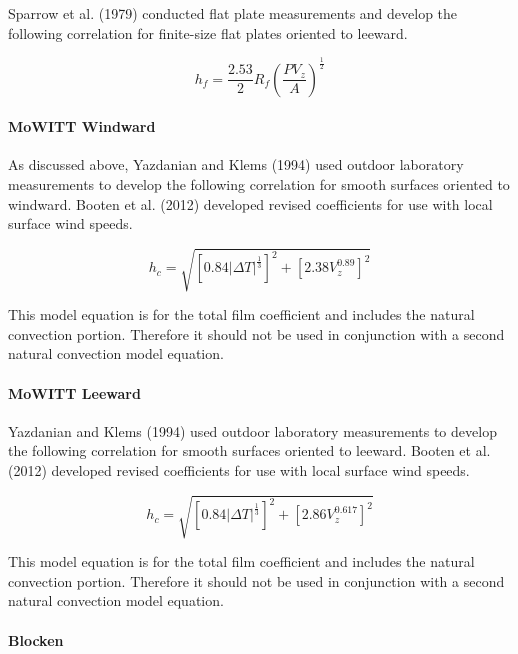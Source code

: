 Sparrow et al. (1979) conducted flat plate measurements and develop the following correlation for finite-size flat plates oriented to leeward.

\begin{equation}
{h_f} = \frac{{2.53}}{2}{R_f}{\left( {\frac{{P{V_z}}}{A}} \right)^{{\frac{1}{2}}}}
\end{equation}

\paragraph{MoWITT Windward}\label{mowitt-windward}

As discussed above, Yazdanian and Klems (1994) used outdoor laboratory measurements to develop the following correlation for smooth surfaces oriented to windward. Booten et al. (2012) developed revised coefficients for use with local surface wind speeds.

\begin{equation}
{h_c} = \sqrt {{{\left[ {0.84{{\left| {\Delta T} \right|}^{{\frac{1}{3}}}}} \right]}^2} + {{\left[ {2.38  V_z^{0.89}} \right]}^2}}
\end{equation}

This model equation is for the total film coefficient and includes the natural convection portion. Therefore it should not be used in conjunction with a second natural convection model equation.

\paragraph{MoWITT Leeward}\label{mowitt-leeward}

Yazdanian and Klems (1994) used outdoor laboratory measurements to develop the following correlation for smooth surfaces oriented to leeward. Booten et al. (2012) developed revised coefficients for use with local surface wind speeds.

\begin{equation}
{h_c} = \sqrt {{{\left[ {0.84{{\left| {\Delta T} \right|}^{{\frac{1}{3}}}}} \right]}^2} + {{\left[ {2.86  V_z^{0.617}} \right]}^2}}
\end{equation}

This model equation is for the total film coefficient and includes the natural convection portion. Therefore it should not be used in conjunction with a second natural convection model equation.

\paragraph{Blocken}\label{blocken}

